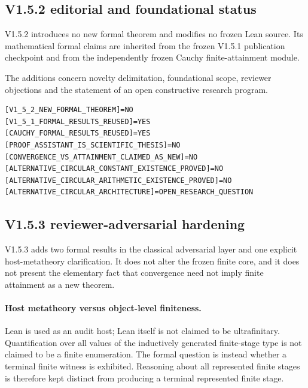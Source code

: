 \documentclass[11pt,a4paper]{article}
\begin{document}
\subsection*{V1.5.2 editorial and foundational status}

V1.5.2 introduces no new formal theorem and modifies no frozen Lean
source. Its mathematical formal claims are inherited from the frozen
V1.5.1 publication checkpoint and from the independently frozen Cauchy
finite-attainment module.

The additions concern novelty delimitation, foundational scope,
reviewer objections and the statement of an open constructive research
program.

\begin{verbatim}
[V1_5_2_NEW_FORMAL_THEOREM]=NO
[V1_5_1_FORMAL_RESULTS_REUSED]=YES
[CAUCHY_FORMAL_RESULTS_REUSED]=YES
[PROOF_ASSISTANT_IS_SCIENTIFIC_THESIS]=NO
[CONVERGENCE_VS_ATTAINMENT_CLAIMED_AS_NEW]=NO
[ALTERNATIVE_CIRCULAR_CONSTANT_EXISTENCE_PROVED]=NO
[ALTERNATIVE_CIRCULAR_ARITHMETIC_EXISTENCE_PROVED]=NO
[ALTERNATIVE_CIRCULAR_ARCHITECTURE]=OPEN_RESEARCH_QUESTION
\end{verbatim}


\subsection*{V1.5.3 reviewer-adversarial hardening}

V1.5.3 adds two formal results in the classical adversarial layer and
one explicit host-metatheory clarification.  It does not alter the
frozen finite core, and it does not present the elementary fact that
convergence need not imply finite attainment as a new theorem.

\paragraph{Host metatheory versus object-level finiteness.}
Lean is used as an audit host; Lean itself is not claimed to be
ultrafinitary.  Quantification over all values of the inductively
generated finite-stage type is not claimed to be a finite enumeration.
The formal question is instead whether a terminal finite witness is
exhibited.  Reasoning about all represented finite stages is therefore
kept distinct from producing a terminal represented finite stage.
\end{document}
